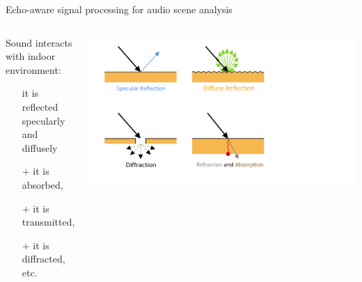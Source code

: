 \begin{frame}[t]{\alert{Echo-aware} signal processing for audio scene analysis}

    \begin{columns}[onlytextwidth]
        \begin{block}{Sound interacts with indoor environment:}
            \small
            \begin{itemize}
                \item[] it is reflected
                \\\hspace{1em} specularly and diffusely\hspace{1em}
                \item[$+$] it is absorbed,
                \item[$+$] it is transmitted,
                \item[$+$] it is diffracted, etc.
            \end{itemize}
        \end{block}

        \includegraphics[trim={0 0 50 0},clip,width=\textwidth]{figures/sound_refletion.png}
    \end{columns}

    \pause


\end{frame}
